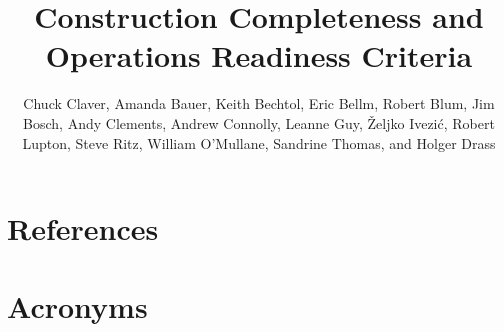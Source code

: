 \documentclass[SE,authoryear,toc]{lsstdoc}
\title{Construction Completeness and Operations Readiness Criteria}
\author{%
Chuck Claver,
Amanda Bauer,
Keith Bechtol,
Eric Bellm,
Robert Blum,
Jim Bosch,
Andy Clements,
Andrew Connolly,
Leanne Guy,
\v{Z}eljko Ivezi\'{c},
Robert Lupton,
Steve Ritz,
William O'Mullane,
Sandrine Thomas, and
Holger Drass
}
\date{\vcsDate}
\begin{document}
\maketitle






\pagebreak

\appendix
\section{References} \label{sec:bib}
\renewcommand{\refname}{} %


\pagebreak

\section{Acronyms} \label{sec:acronyms}

\end{document}
